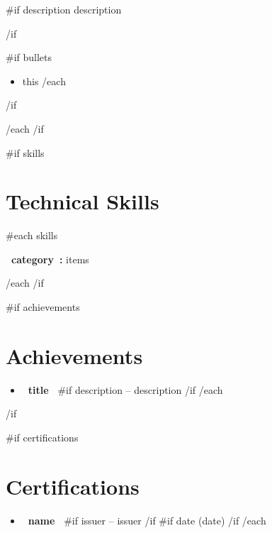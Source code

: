 \documentclass[10pt,a4paper]{article}
\begin{document}
{{#if description}}
{{description}}
\par
\vspace{2pt}
{{/if}}

{{#if bullets}}
\begin{itemize}
    {{#each bullets}}
    \item {{this}}
    {{/each}}
\end{itemize}
{{/if}}

\vspace{4pt}

{{/each}}
{{/if}}

{{#if skills}}
\section{Technical Skills}

{{#each skills}}

\textbf{ {{~category~}}:}
{{items}}

\par
\vspace{2pt}

{{/each}}
{{/if}}

{{#if achievements}}
\section{Achievements}

\begin{itemize}
    {{#each achievements}}
    \item
    \textbf{ {{~title~}} }
    {{#if description}}
    -- {{description}}
    {{/if}}
    {{/each}}
\end{itemize}

{{/if}}

{{#if certifications}}
\section{Certifications}

\begin{itemize}
    {{#each certifications}}
    \item
    \textbf{ {{~name~}} }
    {{#if issuer}}
    -- {{issuer}}
    {{/if}}
    {{#if date}}
    \enspace
    {\small\color{muted}({{date}})}
    {{/if}}
    {{/each}}
\end{itemize}
\end{document}
